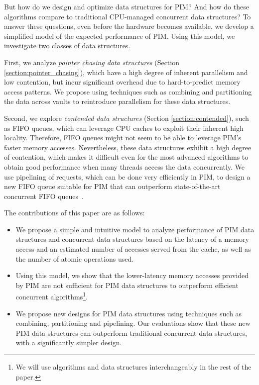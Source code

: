 But how do we design and optimize data structures for PIM? And how do these algorithms compare to traditional CPU-managed concurrent data structures? To answer these questions, even before the hardware becomes available, we develop a simplified model of the expected performance of PIM. Using this model, we 
investigate two classes of data structures. 

First, we analyze \emph{pointer chasing data structures} (Section \ref{section:pointer_chasing}), 
which have a high degree of inherent parallelism and low contention, 
but incur significant overhead due to hard-to-predict memory access patterns. 
We propose using techniques such as combining and partitioning 
the data across vaults to reintroduce parallelism for these data structures.

Second, we explore \emph{contended data structures} (Section \ref{section:contended}), such as FIFO queues, 
which can leverage CPU caches to exploit their inherent high locality. 
Therefore, FIFO queues might not seem to be able to leverage PIM's faster memory accesses. 
Nevertheless, these data structures exhibit a high degree of contention, which makes it difficult even for 
the most advanced algorithms to obtain good performance when many threads access the data concurrently. 
We use pipelining of requests, which can be done very efficiently in PIM, to design a new FIFO queue 
suitable for PIM that can outperform state-of-the-art concurrent FIFO queues~\cite{Morrison13, Hendler10}.

The contributions of this paper are as follows:
\begin{itemize}
\item We propose a simple and intuitive model to analyze performance of PIM data structures and
concurrent data structures based on the latency of a memory access and an estimated number of 
accesses served from the cache, as well as the number of atomic operations used. 
\item Using this model, we show that the lower-latency memory accesses provided by PIM 
are not sufficient for PIM data structures to outperform efficient concurrent algorithms\footnote{
We will use algorithms and data structures interchangeably in the rest of the paper.}. 
 \item We propose new designs for PIM data structures using 
techniques such as combining, partitioning and pipelining.
Our evaluations show that these new PIM data structures can outperform traditional 
concurrent data structures, with a significantly simpler design. 
\end{itemize}

